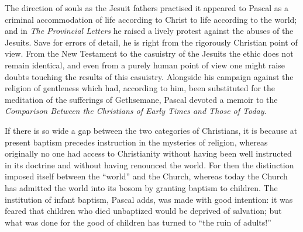 \documentclass[12pt,a4paper]{article}
\newcommand{\opage}[1]{\marginnote{\footnotesize\textit{[#1]}}}
\begin{document}
The direction of souls as the Jesuit fathers practised it appeared to Pascal as
a criminal accommodation of life according to Christ to life according to the
world; and in \emph{The Provincial Letters} he raised a lively protest against
the abuses of the Jesuits. Save for errors of detail, he is right from the
rigorously Christian point of view. From the New Testament to the casuistry of
the Jesuits the ethic does not remain identical, and even from a purely human
point of view one might raise doubts touching the results of this casuistry.
Alongside his campaign against the religion of gentleness which had, according
to him, been substituted for the meditation of the sufferings of Gethsemane,
Pascal devoted a memoir to the \emph{Comparison Between the Christians of Early
Times and Those of Today}.

If there is so wide a gap between the two categories of Christians, it is
because at present baptism precedes instruction in the mysteries of
\opage{238}religion, whereas originally no one had access to Christianity without having
been well instructed in its doctrine and without having renounced the world. For
then the distinction imposed itself between the ``world'' and the Church,
whereas today the Church has admitted the world into its bosom by granting
baptism to children. The institution of infant baptism, Pascal adds, was made
with good intention: it was feared that children who died unbaptized would be
deprived of salvation; but what was done for the good of children has turned to
``the ruin of adults!''
\end{document}
